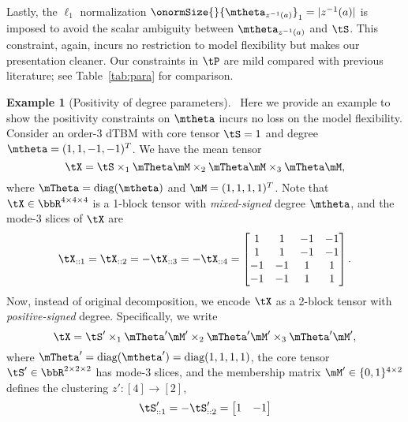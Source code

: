 \documentclass[lettersize,onecolumn,journal]{IEEEtran}
\theoremstyle{definition}
\theoremstyle{definition}
\newtheorem{example}{Example}
\begin{document}
Lastly, the $\ell_1$ normalization $\onormSize{}{\mtheta_{z^{-1}(a)}}_1=|z^{-1}(a)|$ is imposed to avoid the scalar ambiguity between $\mtheta_{z^{-1}(a)}$ and $\tS$. This constraint, again, incurs no restriction to model flexibility but makes our presentation cleaner.   {Our constraints in $\tP$ are mild compared with previous literature; see Table~\ref{tab:para} for comparison.} 

\begin{example}[Positivity of degree parameters]~\label{ex:positive}
Here we provide an example to show the positivity constraints on $\mtheta$ incurs no loss on the model flexibility. 
Consider an order-3 dTBM with core tensor $\tS = 1$ and degree $\mtheta = (1,1,-1, -1)^T$. We have the mean tensor 
\begin{equation}
    \tX = \tS \times_1 \mTheta \mM \times_2 \mTheta \mM \times_3 \mTheta \mM,
\end{equation}
where $\mTheta = \text{diag}(\mtheta)$ and $\mM = (1,1,1,1)^T$. Note that $\tX \in \bbR^{4 \times 4 \times 4}$ is a 1-block tensor with \emph{mixed-signed} degree $\mtheta$, and the mode-3 slices of $\tX$ are
\begin{equation}
    \tX_{::1} = \tX_{::2} = - \tX_{::3} = -\tX_{::4}  = \begin{bmatrix}
    1 & 1& -1& -1 \\
    1 & 1& -1& -1 \\
    -1& -1&1 & 1\\
     -1& -1&1 & 1
    \end{bmatrix}.
\end{equation}
Now, instead of original decomposition, we encode $\tX$ as a 2-block tensor with \emph{positive-signed} degree. Specifically, we write
\begin{equation}
     \tX = \tS' \times_1 \mTheta' \mM' \times_2 \mTheta' \mM'  \times_3 \mTheta' \mM' , 
\end{equation}
where $\mTheta' = \text{diag}(\mtheta') = \text{diag}(1,1, 1, 1)$, the core tensor $\tS' \in \bbR^{2 \times 2 \times 2}$ has mode-3 slices, and the membership matrix $\mM'\in\{0,1\}^{4\times 2}$ defines the clustering $z'\colon[4]\to[2]$,
\begin{equation}
    \tS'_{::1} = -\tS'_{::2} = \begin{bmatrix}
    1 & -1 \\

\end{bmatrix}
\end{equation}
\end{example}
\end{document}
